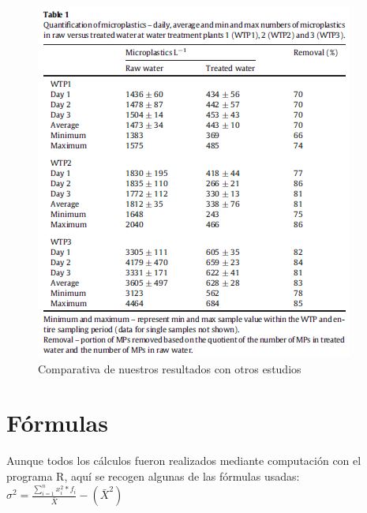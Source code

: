 \documentclass[a4paper,11pt]{article}
\begin{document}
	\begin{figure}[h]
	\centering
	\includegraphics[scale=0.5]{tabla3.png}
	\caption{Comparativa de nuestros resultados con otros estudios}
	\label{tabla3}
	
	\end{figure}

\section{Fórmulas}
	Aunque todos los cálculos fueron realizados mediante computación con el programa R, aquí se recogen algunas de las fórmulas usadas:\\
	$\sigma^2=\frac{\sum_{i=1}^{n}x_{i}^2*f_{i}}{\bar{X}}-(\bar{X}^2)$	
	
	
	
	
\end{document}
